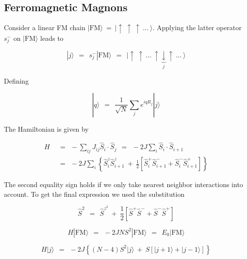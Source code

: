 \documentclass[10pt]{report}
\numberwithin{equation}{chapter}
\begin{document}
\subsection{Ferromagnetic Magnons}

Consider a linear FM chain $ | \text{FM} \rangle ~=~ | \uparrow~ \uparrow~ \uparrow~ ...~ \rangle$. Applying the latter operator $ s^-_j$ on  $| \text{FM} \rangle$ leads to

\begin{equation}
  | j \rangle ~~=~~ s^-_j | \text{FM} \rangle ~~=~~ 
  | \uparrow~ \uparrow~ ...~ \uparrow \underbrace{\downarrow}_{j} \uparrow~ ...~ \rangle
\end{equation}


Defining

\begin{equation}
  | q \rangle ~~=~~ \frac{1}{\sqrt{N}} \sum_j e^{i q R_j} | j \rangle
\end{equation}

The Hamiltonian is given by

\begin{align}
  H ~~& =~~ - \sum_{ij} J_{ij} \hat{S}_i \cdot \hat{S}_j ~~=~~ -2J \sum_i \hat{S}_i \cdot \hat{S}_{i+1}\nonumber \\
      & =~~ - 2J \sum_i \left\{ \hat{S}^z_i \hat{S}^z_{i+1} ~+~ 
      \frac{1}{2} \left[ \hat{S}^+_i \hat{S}^-_{i+1} + \hat{S}^-_i \hat{S}^+_{i+1} \right]  \right\}
\end{align}

The second equality sign holds if we only take nearest neighbor interactions into account. To get the final expression we used the substitution


\begin{equation}
  \hat{S}^2 ~~=~~ \hat{S}^{z^2} ~+~ \frac{1}{2} \left[ \hat{S}^+ \hat{S}^- + \hat{S}^- \hat{S}^+ \right]
\end{equation}



\begin{equation}
  H | \text{FM} \rangle ~~=~~ -2 J N S^2 | \text{FM} \rangle ~~=~~ E_0 | \text{FM} \rangle
\end{equation}

\begin{equation}
  H | j \rangle ~~=~~ -2J \left\{ (N-4) S^2 | j \rangle ~+~ S \left[ |j+1\rangle + |j-1\rangle \right] \right\}
\end{equation}
\end{document}
